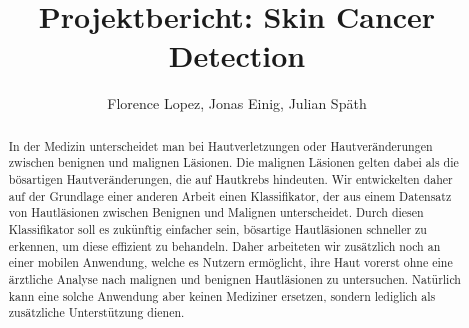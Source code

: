 \documentclass[a4paper, doc]{apa6}
\title{Projektbericht: Skin Cancer Detection}
\author{Florence Lopez, Jonas Einig, Julian Späth }
\affiliation{Department of Computer Science, University of Tübingen}
\begin{document}
\maketitle
\begin{abstract}

In der Medizin unterscheidet man bei Hautverletzungen oder Hautveränderungen zwischen benignen und malignen Läsionen. Die malignen Läsionen gelten dabei als die bösartigen Hautveränderungen, die auf Hautkrebs hindeuten. Wir entwickelten daher auf der Grundlage einer anderen Arbeit einen Klassifikator, der aus einem Datensatz von Hautläsionen zwischen Benignen und Malignen unterscheidet. Durch diesen Klassifikator soll es zukünftig einfacher sein, bösartige Hautläsionen schneller zu erkennen, um diese effizient zu behandeln. Daher arbeiteten wir zusätzlich noch an einer mobilen Anwendung, welche es Nutzern ermöglicht, ihre Haut vorerst ohne eine ärztliche Analyse nach malignen und benignen Hautläsionen zu untersuchen. Natürlich kann eine solche Anwendung aber keinen Mediziner ersetzen, sondern lediglich als zusätzliche Unterstützung dienen. 
\end{abstract}
    








\end{document}
